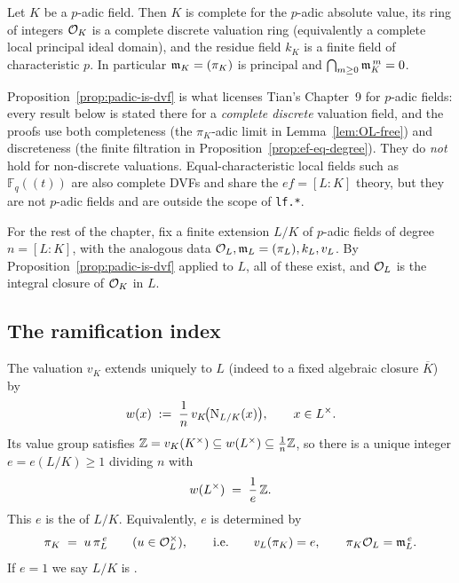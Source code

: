 \begin{proposition}
\label{prop:padic-is-dvf}
\notready
Let $K$ be a $p$-adic field. Then $K$ is complete for the $p$-adic absolute
value, its ring of integers $\mathcal{O}_K$ is a complete discrete valuation ring
(equivalently a complete local principal ideal domain), and the residue field
$k_K$ is a finite field of characteristic $p$. In particular $\mathfrak{m}_K=(\pi_K)$ is
principal and $\bigcap_{m\ge 0}\mathfrak{m}_K^{\,m}=0$.
\end{proposition}

\begin{remark}
\label{rem:dvf-license}
Proposition~\ref{prop:padic-is-dvf} is what licenses Tian's Chapter~9 for
$p$-adic fields: every result below is stated there for a \emph{complete
discrete} valuation field, and the proofs use both completeness (the
$\pi_K$-adic limit in Lemma~\ref{lem:OL-free}) and discreteness (the finite
filtration in Proposition~\ref{prop:ef-eq-degree}). They do \emph{not} hold for
non-discrete valuations. Equal-characteristic local fields such as
$\mathbb{F}_q((t))$ are also complete DVFs and share the $ef=[L:K]$ theory, but
they are not $p$-adic fields and are outside the scope of \texttt{lf.*}.
\end{remark}

\medskip
For the rest of the chapter, fix a finite extension $L/K$ of $p$-adic fields of
degree $n=[L:K]$, with the analogous data $\mathcal{O}_L,\mathfrak{m}_L=(\pi_L),k_L,v_L$. By
Proposition~\ref{prop:padic-is-dvf} applied to $L$, all of these exist, and
$\mathcal{O}_L$ is the integral closure of $\mathcal{O}_K$ in $L$.

\subsection{The ramification index}
\label{subsec:ram-index}

\begin{definition}
\label{def:ramification-index}
\mathlibok
The valuation $v_K$ extends uniquely to $L$ (indeed to a fixed algebraic
closure $\overline K$) by
\[
  w(x) \;:=\; \frac{1}{n}\,v_K\!\bigl(\operatorname{N}_{L/K}(x)\bigr),
  \qquad x\in L^\times .
\]
Its value group satisfies $\mathbb{Z} = v_K(K^\times)\subseteq w(L^\times)\subseteq
\tfrac1n\mathbb{Z}$, so there is a unique integer $e=e(L/K)\ge 1$ dividing $n$ with
\[
  w(L^\times) \;=\; \frac1e\,\mathbb{Z} .
\]
This $e$ is the  of $L/K$.
Equivalently, $e$ is determined by
\[
  \pi_K \;=\; u\,\pi_L^{\,e}\qquad(u\in\mathcal{O}_L^\times),
  \qquad\text{i.e.}\qquad
  v_L(\pi_K)=e,\qquad \pi_K\mathcal{O}_L=\mathfrak{m}_L^{\,e}.
\]
If $e=1$ we say $L/K$ is .
\end{definition}

